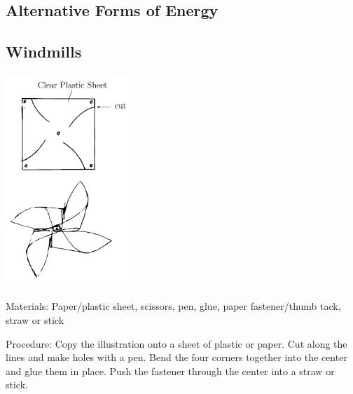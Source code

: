 \begin{multicols}{2}
\vfill
\columnbreak


\section*{Alternative Forms of Energy}


\subsection{Windmills}

\begin{center}
\includegraphics[width=0.35\textwidth]{./img/windmill.png}
\end{center}

\begin{description*}
\item[Materials:]{Paper/plastic sheet, scissors, pen, glue, paper fastener/thumb tack, straw or stick}
\item[Procedure:]{Copy the illustration onto a sheet of plastic or paper. Cut along the lines and make holes with a pen. Bend the four corners together into the center and glue them in place. Push the fastener through the center into a straw or stick.}
\end{description*}


\end{multicols}

